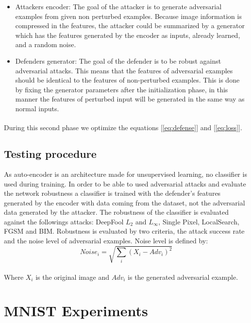 \documentclass[12pt]{article}
\begin{document}
\begin{itemize}
\item Attackers encoder: The goal of the attacker is to generate adversarial examples from given non perturbed examples. Because image information is compressed in the features, the attacker could be summarized by a generator which has the features generated by the encoder as inputs, already learned, and a random noise.
\item Defenders generator: The goal of the defender is to be robust against adversarial attacks. This means that the features of adversarial examples should be identical to the features of non-perturbed examples. This is done by fixing the generator parameters after the initialization phase, in this manner the features of perturbed input will be generated in the same way as normal inputs.
\end{itemize}

\paragraph{}
During this second phase we optimize the equations [\ref{eq:defense}] and [\ref{eq:loss}].

\subsection{Testing procedure}
As auto-encoder is an architecture made for unsupervised learning, no classifier is used during training. In order to be able to used adversarial attacks and evaluate the network robustness a classifier is trained with the defender’s features generated by the encoder with data coming from the dataset, not the adversarial data generated by the attacker. The robustness of the classifier is evaluated against the followings attacks: DeepFool $L_{2}$ and $L_{\infty}$, Single Pixel, LocalSearch, FGSM and BIM. Robustness is evaluated by two criteria, the attack success rate and the noise level of adversarial examples. Noise level is defined by:
\begin{equation}
Noise_{i} = \sqrt{\sum_{i}(X_{i} - Adv_{i})^{2}}
\end{equation}
\\
Where $X_{i}$ is the original image and $Adv_{i}$ is the generated adversarial example.

\section{MNIST Experiments}
\end{document}
